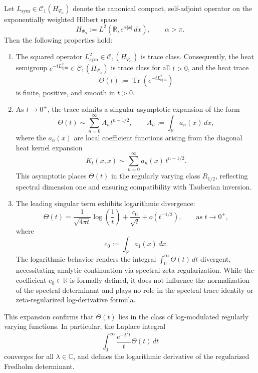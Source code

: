 \begin{lemma}
\label{lem:heat-trace-expansion}
Let \( L_{\mathrm{sym}} \in \mathcal{C}_1(H_{\Psi_\alpha}) \) denote the canonical compact, self-adjoint operator on the exponentially weighted Hilbert space
\[
H_{\Psi_\alpha} := L^2(\mathbb{R}, e^{\alpha|x|} \, dx), \qquad \alpha > \pi.
\]
Then the following properties hold:
\begin{enumerate}
    \item The squared operator \( L_{\mathrm{sym}}^2 \in \mathcal{C}_1(H_{\Psi_\alpha}) \) is trace class. Consequently, the heat semigroup \( e^{-tL_{\mathrm{sym}}^2} \in \mathcal{C}_1(H_{\Psi_\alpha}) \) is trace class for all \( t > 0 \), and the heat trace
    \[
    \Theta(t) := \operatorname{Tr}(e^{-tL_{\mathrm{sym}}^2})
    \]
    is finite, positive, and smooth in \( t > 0 \).

    \item As \( t \to 0^+ \), the trace admits a singular asymptotic expansion of the form
    \[
    \Theta(t) \sim \sum_{n=0}^{\infty} A_n t^{n - 1/2}, \qquad A_n := \int_{\mathbb{R}} a_n(x) \, dx,
    \]
    where the \( a_n(x) \) are local coefficient functions arising from the diagonal heat kernel expansion
    \[
    K_t(x,x) \sim \sum_{n=0}^{\infty} a_n(x) \, t^{n - 1/2}.
    \]
    This asymptotic places \( \Theta(t) \) in the regularly varying class \( R_{1/2} \), reflecting spectral dimension one and ensuring compatibility with Tauberian inversion.

    \item The leading singular term exhibits logarithmic divergence:
    \[
    \Theta(t) = \frac{1}{\sqrt{4\pi t}} \log\left( \frac{1}{t} \right)
    + \frac{c_0}{\sqrt{t}} + o(t^{-1/2}), \qquad \text{as } t \to 0^+,
    \]
    where
    \[
    c_0 := \int_{\mathbb{R}} a_1(x) \, dx.
    \]
    The logarithmic behavior renders the integral \( \int_0^\infty \Theta(t) \, dt \) divergent, necessitating analytic continuation via spectral zeta regularization. While the coefficient \( c_0 \in \mathbb{R} \) is formally defined, it does not influence the normalization of the spectral determinant and plays no role in the spectral trace identity or zeta-regularized log-derivative formula.
\end{enumerate}

This expansion confirms that \( \Theta(t) \) lies in the class of log-modulated regularly varying functions. In particular, the Laplace integral
\[
\int_0^\infty \frac{e^{-\lambda^2 t}}{t} \Theta(t) \, dt
\]
converges for all \( \lambda \in \mathbb{C} \), and defines the logarithmic derivative of the regularized Fredholm determinant.
\end{lemma}
